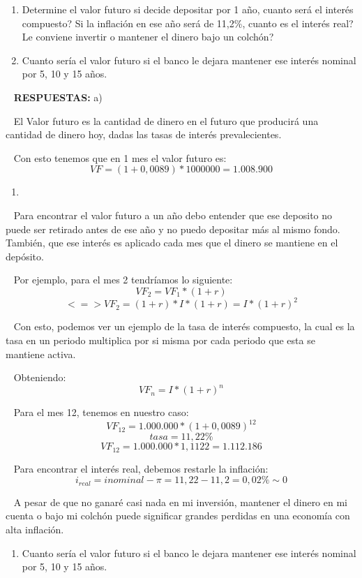 \documentclass[
  letterpaper,
  DIV=11,
  numbers=noendperiod]{scrreport}
\providecommand{\tightlist}{%
  \setlength{\itemsep}{0pt}\setlength{\parskip}{0pt}}\usepackage{longtable,booktabs,array}
\begin{document}
\begin{enumerate}
\def\labelenumi{\alph{enumi})}
\setcounter{enumi}{1}
\item
  Determine el valor futuro si decide depositar por 1 año, cuanto será
  el interés compuesto? Si la inflación en ese año será de 11,2\%,
  cuanto es el interés real? Le conviene invertir o mantener el dinero
  bajo un colchón?
\item
  Cuanto sería el valor futuro si el banco le dejara mantener ese
  interés nominal por 5, 10 y 15 años.
\end{enumerate}

~ \textbf{RESPUESTAS:} a)

~ El Valor futuro es la cantidad de dinero en el futuro que producirá
una cantidad de dinero hoy, dadas las tasas de interés prevalecientes.

~ Con esto tenemos que en 1 mes el valor futuro es:
\[VF = (1+0,0089)*1000000=1.008.900\]

\begin{enumerate}
\def\labelenumi{\alph{enumi})}
\setcounter{enumi}{1}
\tightlist
\item
\end{enumerate}

~ Para encontrar el valor futuro a un año debo entender que ese deposito
no puede ser retirado antes de ese año y no puedo depositar más al mismo
fondo. También, que ese interés es aplicado cada mes que el dinero se
mantiene en el depósito.

~ Por ejemplo, para el mes 2 tendríamos lo siguiente:
\[{VF}_2 = {VF}_1 * (1+r)\] \[<=> {VF}_2 = (1+r)*I* (1+r)=I*(1+r)^2\]

~ Con esto, podemos ver un ejemplo de la tasa de interés compuesto, la
cual es la tasa en un periodo multiplica por si misma por cada periodo
que esta se mantiene activa.

~ Obteniendo: \[{VF}_n = I*(1+r)^n\]

~ Para el mes 12, tenemos en nuestro caso:
\[{VF}_{12} = 1.000.000*(1+0,0089)^{12}\] \[tasa=11,22\%\]
\[{VF}_{12} = 1.000.000*1,1122=1.112.186\]

~ Para encontrar el interés real, debemos restarle la inflación:
\[i_{real} = i{nominal}-\pi = 11,22 - 11,2 = 0,02\% \sim 0\]

~ A pesar de que no ganaré casi nada en mi inversión, mantener el dinero
en mi cuenta o bajo mi colchón puede significar grandes perdidas en una
economía con alta inflación.

\begin{enumerate}
\def\labelenumi{\alph{enumi})}
\setcounter{enumi}{2}
\tightlist
\item
  Cuanto sería el valor futuro si el banco le dejara mantener ese
  interés nominal por 5, 10 y 15 años.
\end{enumerate}
\end{document}
